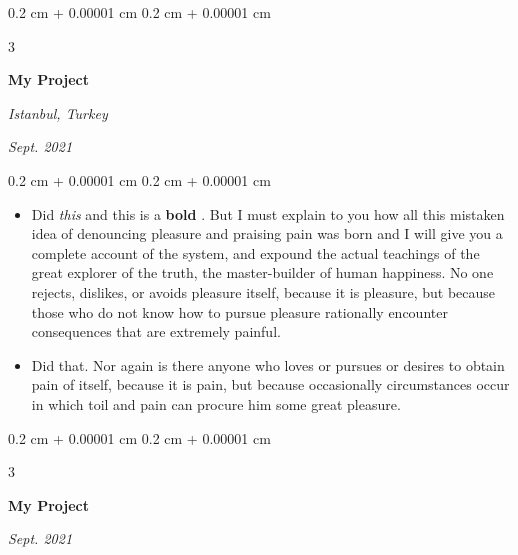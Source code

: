 \documentclass[10pt, letterpaper]{article}
\newenvironment{highlights}{
    \begin{itemize}[
        topsep=0.10 cm,
        parsep=0.10 cm,
        partopsep=0pt,
        itemsep=0pt,
        leftmargin=0.4 cm + 10pt + 0.6 cm
    ]
}{
    \end{itemize}
} %
\newenvironment{onecolentry}{
    \begin{adjustwidth}{
        0.2 cm + 0.00001 cm
    }{
        0.2 cm + 0.00001 cm
    }
}{
    \end{adjustwidth}
} %
\newenvironment{threecolentry}[3][]{
    \onecolentry
    \def\thirdColumn{#3}
    \setcolumnwidth{0.6 cm, \fill, 4.5 cm}
    \begin{paracol}{3}
    #2 \switchcolumn
}{
    \switchcolumn \raggedleft \thirdColumn
    \end{paracol}
    \endonecolentry
} %
\let\hrefWithoutArrow\href
\renewcommand{\href}[2]{\hrefWithoutArrow{#1}{\mbox{\ifthenelse{\equal{#2}{}}{ }{#2 }\raisebox{.15ex}{\footnotesize \faExternalLink*}}}}
\begin{document}
        \vspace{0.2 cm-3px}

        \begin{threecolentry}{
            \vspace*{\fill}
            \textbullet
            \vspace*{3px}
            \vspace*{\fill}
        }{
        \textit{Istanbul, Turkey}    
            
        \textit{Sept. 2021}}
            \textbf{My Project}
        \end{threecolentry}

        \vspace{0.10 cm-3px}
        \begin{onecolentry}
            \begin{highlights}
                \item Did \textit{this} and this is a \textbf{bold} \href{https://example.com}{link}. But I must explain to you how all this mistaken idea of denouncing pleasure and praising pain was born and I will give you a complete account of the system, and expound the actual teachings of the great explorer of the truth, the master-builder of human happiness. No one rejects, dislikes, or avoids pleasure itself, because it is pleasure, but because those who do not know how to pursue pleasure rationally encounter consequences that are extremely painful.
                \item Did that. Nor again is there anyone who loves or pursues or desires to obtain pain of itself, because it is pain, but because occasionally circumstances occur in which toil and pain can procure him some great pleasure.
            \end{highlights}
        \end{onecolentry}


        \vspace{0.2 cm-3px}

        \begin{threecolentry}{
            \vspace*{\fill}
            \textbullet
            \vspace*{3px}
            \vspace*{\fill}
        }{
            
            
        \textit{Sept. 2021}}
            \textbf{My Project}
        \end{threecolentry}
\end{document}
